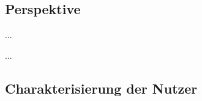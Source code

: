 \documentclass[12pt]{article} %
\begin{document}
\subsection{Perspektive}
...






...

\subsection{Charakterisierung der Nutzer}





\end{document}
